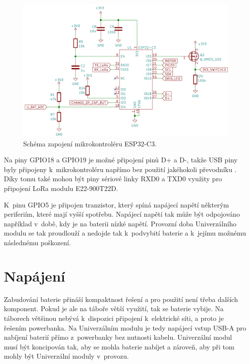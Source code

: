 \begin{figure}[!h]
  \begin{center}
    \includegraphics[scale=0.5]{obrazky/ESP32-C3.png}
  \end{center}
  \caption[Schéma zapojení mikrokontroléru ESP32-C3]{Schéma zapojení mikrokontroléru ESP32-C3.}
\end{figure}

Na piny GPIO18 a GPIO19 je možné připojení pinů D+ a D-, takže USB piny byly připojeny k~mikrokontroléru napřímo bez použití jakéhokoli převodníku \cite{ESP_C3_dtsh}. Díky 
tomu také mohou být piny sériové linky RXD0 a TXD0 využity pro připojení LoRa modulu E22-900T22D.

K~pinu GPIO5 je připojen tranzistor, který spíná napájecí napětí některým periferiím, které mají vyšší spotřebu. Napájecí napětí tak může být odpojováno například v~době,
kdy je na baterii nízké napětí. Provozní doba Univerzálního modulu se tak proudlouží a nedojde tak k~podvybití baterie a k~jejímu možnému následnému poškození. 

\section{Napájení}
Zabudování baterie přináší kompaktnost řešení a pro použití není třeba dalších komponent. Pokud je ale na táboře větší využití, tak se baterie vybije.
Na táborech většinou nebývá k~dispozici připojení k~elektrické síti, a proto je řešením powerbanka. Na Univerzálním modulu je tedy napájecí vstup USB-A pro nabíjení 
baterií přímo z~powerbanky bez nutnosti kabelu. Univerzální modul musí být koncipován tak, aby se mohla baterie nabíjet a zároveň, aby při tom mohly být Univerzální 
moduly v~provozu.

